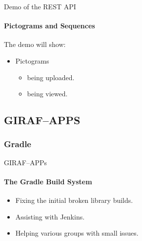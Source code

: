         \begin{frame}[t]{Demo of the REST API}\framesubtitle{Pictograms and Sequences}
            The demo will show:
            \begin{itemize}
                \item Pictograms
                \begin{itemize}
                    \item being uploaded.
                    \item being viewed.
                \end{itemize}
            \end{itemize}
        \end{frame}

    \subsection{GIRAF--APPS}
        \subsubsection{Gradle}
            \begin{frame}[t]{GIRAF--APPs}\framesubtitle{The Gradle Build System}
                \begin{itemize}
                    \item Fixing the initial broken library builds.
                    \item Assisting with Jenkins.
                    \item Helping various groups with small issues.
                \end{itemize}
            \end{frame}

